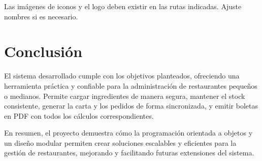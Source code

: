 \documentclass[12pt,a4paper]{article}
\begin{document}
Las imágenes de iconos y el logo deben existir en las rutas indicadas. Ajuste nombres si es necesario.

\newpage

\section{Conclusión}
El sistema desarrollado cumple con los objetivos planteados, ofreciendo una herramienta práctica y confiable para la administración de restaurantes pequeños o medianos. Permite cargar ingredientes de manera segura, mantener el stock consistente, generar la carta y los pedidos de forma sincronizada, y emitir boletas en PDF con todos los cálculos correspondientes.

En resumen, el proyecto demuestra cómo la programación orientada a objetos y un diseño modular permiten crear soluciones escalables y eficientes para la gestión de restaurantes, mejorando y facilitando futuras extensiones del sistema.
\end{document}
